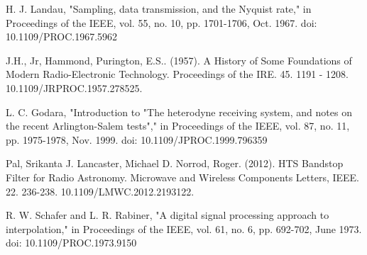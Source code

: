 \documentclass{report}
\begin{document}
H. J. Landau, "Sampling, data transmission, and the Nyquist rate," in Proceedings of the IEEE, vol. 55, no. 10, pp. 1701-1706, Oct. 1967.
doi: 10.1109/PROC.1967.5962

J.H., Jr, Hammond,  Purington, E.S.. (1957). A History of Some Foundations of Modern Radio-Electronic Technology. Proceedings of the IRE. 45. 1191 - 1208. 10.1109/JRPROC.1957.278525. 

L. C. Godara, "Introduction to "The heterodyne receiving system, and notes on the recent Arlington-Salem tests"," in Proceedings of the IEEE, vol. 87, no. 11, pp. 1975-1978, Nov. 1999.
doi: 10.1109/JPROC.1999.796359

Pal, Srikanta  J. Lancaster, Michael D. Norrod, Roger. (2012). HTS Bandstop Filter for Radio Astronomy. Microwave and Wireless Components Letters, IEEE. 22. 236-238. 10.1109/LMWC.2012.2193122. 

R. W. Schafer and L. R. Rabiner, "A digital signal processing approach to interpolation," in Proceedings of the IEEE, vol. 61, no. 6, pp. 692-702, June 1973.
doi: 10.1109/PROC.1973.9150
\end{document}
